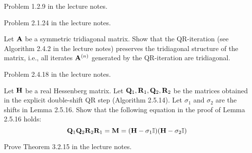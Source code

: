 
\begin{Sheet}
  \label{sheet13}
  
  \begin{Problem}
      Problem 1.2.9 in the lecture notes.
  \end{Problem}

    \begin{Problem}
        Problem 2.1.24 in the lecture notes.
    \end{Problem}

    \begin{Problem}
        Let $\mathbf A$ be a symmetric tridiagonal matrix. Show that the
        QR-iteration (see Algorithm 2.4.2 in the lecture notes) preserves
        the tridiagonal structure of the matrix, i.e., all iterates
        $\mathbf A^{(n)}$ generated by the QR-iteration are tridiagonal.
     \end{Problem}

    \begin{Problem}
        Problem 2.4.18 in the lecture notes.
    \end{Problem}

    \begin{Problem}
        Let $\mathbf H$ be a real Hessenberg matrix.
        Let $\mathbf Q_1,\mathbf R_1,\mathbf Q_2,\mathbf R_2$ be the matrices obtained in the explicit double-shift QR step (Algorithm  2.5.14).
        Let $\sigma_1$ and $\sigma_2$ are the shifts in Lemma 2.5.16.
        Show that the following equation in the proof of Lemma 2.5.16 holds:
        \begin{equation*}
            \mathbf Q_1\mathbf Q_2\mathbf R_2\mathbf R_1 = \mathbf M = (\mathbf H - \sigma_1\mathbb I)(\mathbf H - \sigma_2\mathbb I)
        \end{equation*}
    \end{Problem}

  \begin{Problem}
    Prove Theorem 3.2.15 in the lecture notes.
  \end{Problem}


\end{Sheet}
